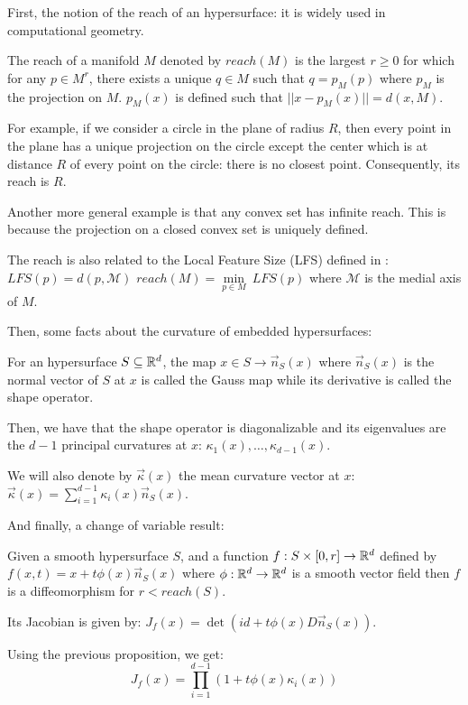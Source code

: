 First, the notion of the reach of an hypersurface: it is widely used in
computational geometry.
\begin{definition}
    The reach of a manifold $ M $ denoted by $ reach(M) $ is the largest $ r
    \geq 0 $ for which for any $ p \in M^r $, there exists a unique $ q \in M $
    such that $ q = p_M(p) $ where $ p_M $ is the projection on $ M $. $ p_M(x)
    $ is defined such that $ || x - p_M(x) || = d(x, M) $.
\end{definition}

For example, if we consider a circle in the plane of radius $ R $, then every
point in the plane has a unique projection on the circle except the center which
is at distance $ R $ of every point on the circle: there is no closest point.
Consequently, its reach is $ R $.

Another more general example is that any convex set has infinite reach. This is
because the projection on a closed convex set is uniquely defined.

The reach is also related to the Local Feature Size (LFS) defined in
\cite{amenta1999surface}: $ LFS(p) = d(p, \mathcal{M}) $ $ reach(M) =
\min\limits_{p \in M}~LFS(p) $ where $ \mathcal{M}  $ is the medial axis of $ M
$.


Then, some facts about the curvature of embedded hypersurfaces:

\begin{proposition}
    For an hypersurface $ S \subseteq \mathbb{R}^d $, the map $ x \in S \rightarrow
    \vec{n}_S(x) $ where $ \vec{n}_S(x) $ is the normal vector of $ S $ at $ x $ is
    called the Gauss map while its derivative is called the shape operator.

    Then, we have that the shape operator is diagonalizable and its eigenvalues
    are the $ d-1 $ principal curvatures at $ x $: $ \kappa_1(x), \ldots,
    \kappa_{d-1}(x) $.

    We will also denote by $ \vec{\kappa}(x) $ the mean curvature vector at $ x
    $: $ \vec{\kappa}(x) = \sum_{i=1}^{d-1} \kappa_i(x) \vec{n}_S(x) $.
\end{proposition}

And finally, a change of variable result:

\begin{lemma}
    \label{lemma:diffeo}
    Given a smooth hypersurface $ S $, and a function $ f : S \times [0, r] \to \mathbb{R}^d $
    defined by $ f(x, t) = x + t \phi(x) \vec{n}_S(x) $ where $ \phi : \mathbb{R}^d \to
    \mathbb{R}^d $ is a smooth vector field then $ f $ is a diffeomorphism for $ r < reach(S) $.

    Its Jacobian is given by: $ J_f(x) = \det(id + t \phi(x) D \vec{n}_S (x)) $.

    Using the previous proposition, we get:
    $$ J_f(x) = \prod_{i=1}^{d-1} (1 + t \phi(x) \kappa_i(x)) $$
\end{lemma}

